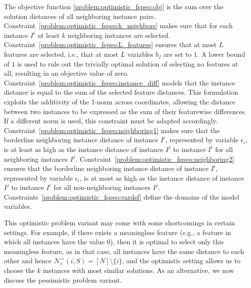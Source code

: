 \documentclass[11pt, a4paper]{article}
\newcommand{\FRil}[1]{\todo[color=black, textcolor=white, inline, author=FR]{#1}}
\newcommand{\I}{{\mathcal{I}}} %
\newcommand{\X}{{\mathcal{X}}} %
\newcommand{\instanceindex}{i}
\newcommand{\fsel}{S} %
\newcommand{\selectionset}{\fsel}
\newcommand{\neighbour}{\ensuremath{\mathcal{N}}}
\newcommand{\sEpsBorder}[1][(\instanceindex,\selectionset)]{\ensuremath{\neighbour^=_\epsilon#1}}
\begin{document}
The objective function \eqref{problem:optimistic_fspeo:obj} is the sum over the solution distances of all neighboring instance pairs. 
Constraint~\eqref{problem:optimistic_fspeo:k_neighbors} makes sure that for each instance $I^i$ at least $k$ neighboring instances are selected.
Constraint~\eqref{problem:optimistic_fspeo:L_features} ensures that at most $L$ features are selected, i.e., that at most $L$ variables $b_f$ are set to $1$. A lower bound of $1$ is used to rule out the trivially optimal solution of selecting no features at all, resulting in an objective value of zero.
Constraint~\eqref{problem:optimistic_fspeo:instance_diff} models that the instance distance is equal to the sum of the selected feature distances. This formulation exploits the additivity of the 1-norm across coordinates, allowing the distance between two instances to be expressed as the sum of their featurewise differences. If a different norm is used, this constraint must be adapted accordingly.
Constraint~\eqref{problem:optimistic_fspeo:neighboring1} makes sure that the borderline neighboring instance distance of instance $I^i$, represented by variable $\epsilon_i$, is at least as high as the instance distance of instance $I^j$ to instance $I^i$ for all neighboring instances $I^j$.
Constraint~\eqref{problem:optimistic_fspeo:neighboring2} ensures that the borderline neighboring instance distance of instance $I^i$, represented by variable $\epsilon_i$, is at most as high as the instance distance of instance $I^j$ to instance $I^i$ for all non-neighboring instances $I^j$.
Constraints~\eqref{problem:optimistic_fspeo:vardef} define the domains of the model variables.

This optimistic problem variant may come with some shortcomings in certain settings. For example,
if there exists a meaningless feature (e.g., a feature in which all instances have the value 0), then it is optimal to select only this meaningless feature, as in that case, all instances have the same distance to each other and hence $\sEpsBorder = [N]\setminus\{i\}$, and the optimistic setting allows us to choose the $k$ instances with most similar solutions.
As an alternative, we now discuss the pessimistic problem variant.
\end{document}
